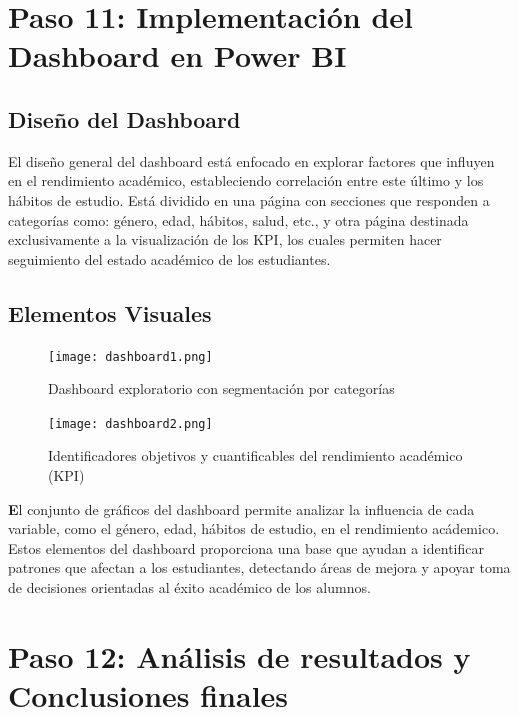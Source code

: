 \documentclass[12pt,letterpaper]{report}
\begin{document}
\section{Paso 11: Implementación del Dashboard en Power BI}

\subsection{Diseño del Dashboard}

El diseño general del dashboard está enfocado en explorar factores que influyen en el rendimiento académico, estableciendo correlación entre este último y los hábitos de estudio. Está dividido en una página con secciones que responden a categorías como: género, edad, hábitos, salud, etc., y otra página destinada exclusivamente a la visualización de los KPI, los cuales permiten hacer seguimiento del estado académico de los estudiantes.

\subsection{Elementos Visuales}

\begin{figure}[!ht]
    \centering
    \texttt{[image: dashboard1.png]}
    \caption{Dashboard exploratorio con segmentación por categorías}
    \label{fig:dashboard1}
\end{figure}

\begin{figure}[!ht]
    \centering
    \texttt{[image: dashboard2.png]}
    \caption{Identificadores objetivos y cuantificables del rendimiento académico (KPI)}
    \label{fig:dashboard2}
\end{figure}

\textbf El conjunto de gráficos del dashboard permite analizar la influencia de cada variable, como el género, edad, hábitos de estudio, en el rendimiento acádemico. Estos elementos del dashboard proporciona una base que ayudan a identificar patrones que afectan a los estudiantes, detectando áreas de mejora y apoyar toma de decisiones orientadas al éxito académico de los alumnos.

\section{Paso 12: Análisis de resultados y Conclusiones finales}
\end{document}
